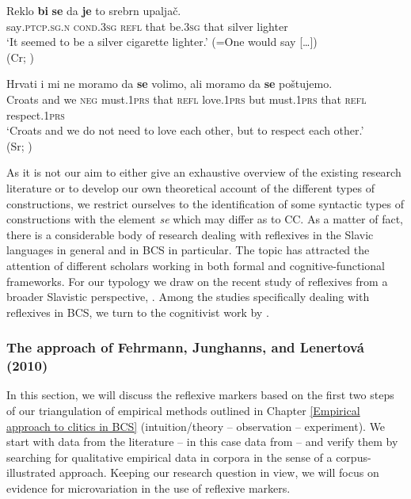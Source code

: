 \begin{exe}\ex\label{(2.34)}
\gll Reklo \textbf{bi} \textbf{se} da \textbf{je} to srebrn upaljač.\\
 say\textsc{.ptcp.sg.n} \textsc{cond.3sg} \textsc{refl} that be\textsc{.3sg} that silver lighter\\
\glt ‘It seemed to be a silver cigarette lighter.’ (=One would say [\dots]) \\
\hfill (Cr; \citealt[][106]{Moulton15})

\ex\label{(2.35)}
\gll Hrvati i mi ne moramo da \textbf{se} volimo, ali moramo da \textbf{se} poštujemo. \\
 Croats and we \textsc{neg} must\textsc{.1prs}  that  \textsc{refl} love\textsc{.1prs} but must\textsc{.1prs} that  \textsc{refl} respect\textsc{.1prs} \\
\glt ‘Croats and we do not need to love each other, but to respect each other.’ \\
\hfill (Sr; \citealt[][103]{Moulton15})
\end{exe}

\noindent As it is not our aim to either give an exhaustive overview of the existing research literature or to develop our own theoretical account of the different types of constructions, we restrict ourselves to the identification of some syntactic types of constructions with the element \textit{se} which may differ as to CC. As a matter of fact, there is a considerable body of research dealing with reflexives in the Slavic languages in general and in BCS in particular. The topic has attracted the attention of different scholars working in both formal and cognitive-functional frameworks. For our typology we draw on the recent study of reflexives from a broader Slavistic perspective, \citet{FJL10}. Among the studies specifically dealing with reflexives in BCS, we turn to the cognitivist work by \citet{Moulton15}.

\subsubsection{The approach of Fehrmann, Junghanns, and Lenertová (2010)}
\label{The approach of Fehrmann, Junghanns and Lenertová (2010)}
\largerpage[2]

In this section, we will discuss the reflexive markers based on the first two steps of our triangulation of empirical methods outlined in Chapter \ref{Empirical approach to clitics in BCS} (intuition/theory – observation – experiment). We start with data from the literature – in this case data from \citet{FJL10} – and verify them by searching for qualitative empirical data in corpora in the sense of a corpus-illustrated approach. Keeping  our research question in view, we will focus on evidence for microvariation in the use of reflexive markers.

